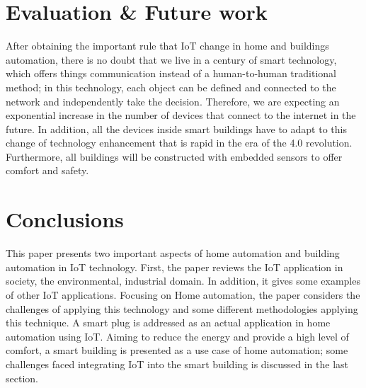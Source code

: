 \documentclass[conference]{IEEEtran}
\begin{document}
\section{Evaluation \& Future work   }

After obtaining the important rule that IoT change in home and buildings automation, there is no doubt that we live in a century of smart technology, which offers things communication instead of a human-to-human traditional method; in this technology, each object can be defined and connected to the network and independently take the decision. Therefore, we are expecting an exponential increase in the number of devices that connect to the internet in the future. In addition, all the devices inside smart buildings have to adapt to this change of technology enhancement that is rapid in the era of the 4.0 revolution. Furthermore, all buildings will be constructed with embedded sensors to offer comfort and safety. 






\section{Conclusions  }

This paper presents two important aspects of home automation and building automation in IoT technology. First, the paper reviews the IoT application in society, the environmental, industrial domain. In addition, it gives some examples of other IoT applications. Focusing on Home automation, the paper considers the challenges of applying this technology and some different methodologies applying this technique. A smart plug is addressed as an actual application in home automation using IoT. Aiming to reduce the energy and provide a high level of comfort, a smart building is presented as a use case of home automation; some challenges faced integrating IoT into the smart building is discussed in the last section.
\end{document}
